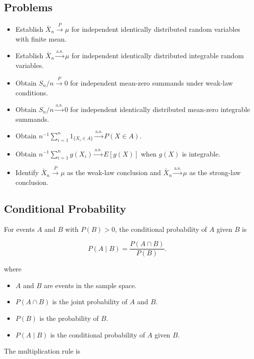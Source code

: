 \documentclass{article}
\begin{document}
\subsection{Problems}

\begin{itemize}
    \item Establish $\bar{X}_n \xrightarrow{P} \mu$ for independent identically distributed random variables with finite mean.
    \item Establish $\bar{X}_n \xrightarrow{\mathrm{a.s.}} \mu$ for independent identically distributed integrable random variables.
    \item Obtain $S_n/n \xrightarrow{P} 0$ for independent mean-zero summands under weak-law conditions.
    \item Obtain $S_n/n \xrightarrow{\mathrm{a.s.}} 0$ for independent identically distributed mean-zero integrable summands.
    \item Obtain $n^{-1}\sum_{i=1}^n 1_{\{X_i\in A\}} \xrightarrow{\mathrm{a.s.}} P(X\in A)$.
    \item Obtain $n^{-1}\sum_{i=1}^n g(X_i) \xrightarrow{\mathrm{a.s.}} E[g(X)]$ when $g(X)$ is integrable.
    \item Identify $\bar{X}_n \xrightarrow{P} \mu$ as the weak-law conclusion and $\bar{X}_n \xrightarrow{\mathrm{a.s.}} \mu$ as the strong-law conclusion.
\end{itemize}

\subsection{Conditional Probability}
For events $A$ and $B$ with $P(B)>0$, the conditional probability of $A$ given $B$ is

$$
P(A\mid B)=\frac{P(A\cap B)}{P(B)}.
$$

where

\begin{itemize}
    \item $A$ and $B$ are events in the sample space.
    \item $P(A\cap B)$ is the joint probability of $A$ and $B$.
    \item $P(B)$ is the probability of $B$.
    \item $P(A\mid B)$ is the conditional probability of $A$ given $B$.
\end{itemize}

The multiplication rule is
\end{document}
